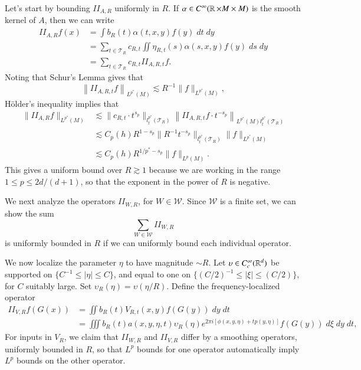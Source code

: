 Let's start by bounding $II_{A,R}$ uniformly in $R$. If $\alpha \in C^\infty(\operatorname{\mathbb{R}} \times M \times M)$ is the smooth kernel of $A$, then we can write
%
\begin{align*}
    II_{A,R} f(x) &= \int b_R(t) \alpha(t,x,y) f(y)\; dt\; dy\\
    &= \sum_{t \in \mathcal{T}_R} c_{R,t} \iint \eta_{R,t}(s) \alpha(s,x,y) f(y)\; ds\; dy\\
    &= \sum_{t \in \mathcal{T}_R} c_{R,t} II_{A,R,t} f.
\end{align*}
%
Noting that Schur's Lemma gives that
%
\[ \left\| II_{A,R,t} f \right\|_{L^{p^*}(M)} \lesssim R^{-1} \| f \|_{L^{p^*}(M)}, \]
%
H\"{o}lder's inequality implies that
%
\begin{align*}
    \| II_{A,R} f \|_{L^{p^*}(M)} &\lesssim \| c_{R,t} \cdot t^{s_p} \|_{l^{p^*}_t(\mathcal{T}_R)} \left\| II_{A,R,t} f \cdot t^{-s_p} \right\|_{L^{p^*}(M) l^{p^*}_t(\mathcal{T}_R)}\\
    &\lesssim C_p(h) R^{1 - s_p} \| R^{-1} t^{-s_p} \|_{l^{p^*}_t(\mathcal{T}_R)} \| f \|_{L^{p^*}(M)}\\
    &\lesssim C_p(h) R^{1/p^* - s_p} \| f \|_{L^p(M)}.
\end{align*}
%
This gives a uniform bound over $R \gtrsim 1$ because we are working in the range $1 \leq p \leq 2d/(d+1)$, so that the exponent in the power of $R$ is negative.

We next analyze the operators $II_{W,R}$, for $W \in \mathcal{W}$. Since $\mathcal{W}$ is a finite set, we can show the sum
%
\[ \sum_{W \in \mathcal{W}} II_{W,R} \]
%
is uniformly bounded in $R$ if we can uniformly bound each individual operator.

We now localize the parameter $\eta$ to have magnitude $\sim R$. Let $\upsilon \in C_c^\infty(\operatorname{\mathbb{R}}^d)$ be supported on $\{ C^{-1} \leq |\eta| \leq C \}$, and equal to one on $\{ (C/2)^{-1} \leq |\xi| \leq (C/2) \}$, for $C$ suitably large. Set $\upsilon_R(\eta) = \upsilon( \eta / R)$. Define the frequency-localized operator
%
\begin{align*}
    II_{V,R} f(G(x)) &= \iint b_R(t) V_{R,t}(x,y) f(G(y))\; dy\; dt\\
    &= \iiint b_R(t) a(x,y,\eta,t) \upsilon_R(\eta) e^{2 \pi i [\phi(x,y,\eta) + t p(y,\eta)]} f(G(y))\; d\xi\; dy\; dt,
\end{align*}
%
For inputs in $V_R$, we claim that $II_{W,R}$ and $II_{V,R}$ differ by a smoothing operators, uniformly bounded in $R$, so that $L^p$ bounds for one operator automatically imply $L^p$ bounds on the other operator.

